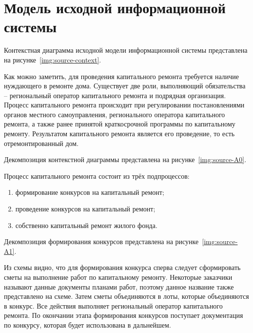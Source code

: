 \section{Модель исходной информационной системы}

Контекстная диаграмма исходной модели информационной системы представлена на рисунке~\ref{img:source-context}.


Как можно заметить, для проведения капитального ремонта требуется наличие нуждающего в ремонте дома.
Существует две роли, выполняющий обязательства -- региональный оператор капитального ремонта и подрядная организация.
Процесс капитального ремонта происходит при регулировании постановлениями органов местного самоуправления, регионального оператора капитального ремонта, а также ранее принятой краткосрочной программы по капитальному ремонту.
Результатом капитального ремонта является его проведение, то есть отремонтированный дом.

Декомпозиция контекстной диаграммы представлена на рисунке~\ref{img:source-A0}.


Процесс капитального ремонта состоит из трёх подпроцессов:

\begin{enumerate}
	\item формирование конкурсов на капитальный ремонт;
	\item проведение конкурсов на капитальный ремонт;
	\item собственно капитальный ремонт жилого фонда.
\end{enumerate}

Декомпозиция формирования конкурсов представлена на рисунке~\ref{img:source-A1}.


Из схемы видно, что для формирования конкурса сперва следует сформировать сметы на выполнение работ по капитальному ремонту.
Некоторые заказчики называют данные документы планами работ, поэтому данное название также представлено на схеме.
Затем сметы объединяются в лоты, которые объединяются в конкурс.
Все действия выполняет региональный оператор капитального ремонта.
По окончании этапа формирования конкурсов поступает документация по конкурсу, которая будет использована в дальнейшем.

